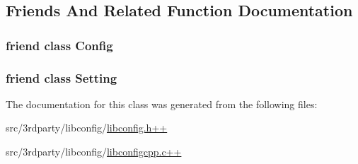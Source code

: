 \subsection{Friends And Related Function Documentation}
\hypertarget{classlibconfig_1_1SettingNotFoundException_ac3da7e21a05bf8852638db7e4dd1b81a}{
\subsubsection[{Config}]{\setlength{\rightskip}{0pt plus 5cm}friend class {\bf Config}\hspace{0.3cm}{\ttfamily [friend]}}}\label{classlibconfig_1_1SettingNotFoundException_ac3da7e21a05bf8852638db7e4dd1b81a}
\hypertarget{classlibconfig_1_1SettingNotFoundException_a9aa0bc1c3d297cabf9a1848178294d38}{
\subsubsection[{Setting}]{\setlength{\rightskip}{0pt plus 5cm}friend class {\bf Setting}\hspace{0.3cm}{\ttfamily [friend]}}}\label{classlibconfig_1_1SettingNotFoundException_a9aa0bc1c3d297cabf9a1848178294d38}


The documentation for this class was generated from the following files\-:\begin{DoxyCompactItemize}
\item 
src/3rdparty/libconfig/\hyperlink{libconfig_8h_09_09}{libconfig.\-h++}\item 
src/3rdparty/libconfig/\hyperlink{libconfigcpp_8c_09_09}{libconfigcpp.\-c++}\end{DoxyCompactItemize}
